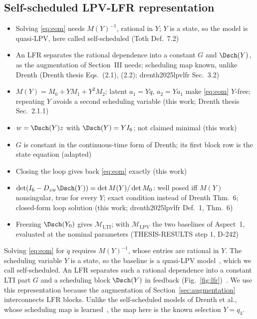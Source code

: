 \subsection{Self-scheduled LPV-LFR representation}\label{sec:lfr}
\ifdraft
\begin{itemize}
\item Solving \eqref{eq:eom} needs $M(Y)^{-1}$, rational in $Y$; $Y$ is a state, so the model is quasi-LPV, here called self-scheduled (Toth Def.~7.2)
\item An LFR separates the rational dependence into a constant $G$ and $\Dsch(Y)$, as the augmentation of Section~III needs; scheduling map known, unlike Drenth (Drenth thesis Eqs.~(2.1), (2.2); drenth2025lpvlfr Sec.~3.2)
\item $M(Y)=M_0+YM_1+Y^2M_2$; latent $a_1=Y\ddot q$, $a_2=Ya_1$ make \eqref{eq:eom} $Y$-free; repeating $Y$ avoids a second scheduling variable (this work; Drenth thesis Sec.~2.1.1)
\item $w=\Dsch(Y)z$ with $\Dsch(Y)=YI_6$; not claimed minimal (this work)
\item $G$ is constant in the continuous-time form of Drenth; its first block row is the state equation (adapted)
\item Closing the loop gives back \eqref{eq:eom} exactly (this work)
\item $\det(I_6-D_{zw}\Dsch(Y))=\det M(Y)/\det M_0$: well posed iff $M(Y)$ nonsingular, true for every $Y$; exact condition instead of Drenth Thm.~6; closed-form loop solution (this work; drenth2025lpvlfr Def.~1, Thm.~6)
\item Freezing $\Dsch(Y_0)$ gives $\mathcal M_{\mathrm{LTI}}$; with $\mathcal M_{\mathrm{LPV}}$ the two baselines of Aspect~1, evaluated at the nominal parameters (THESIS-RESULTS step 1, D-242)
\end{itemize}
\fi
Solving \eqref{eq:eom} for $\ddot q$ requires $M(Y)^{-1}$, whose entries are
rational in $Y$.
The scheduling variable $Y$ is a state, so the baseline is a quasi-LPV
model~\cite[Def.~7.2]{toth2010modeling}, which we call self-scheduled.
An LFR separates such a rational dependence into a constant LTI part $G$ and a
scheduling block $\Dsch(Y)$ in feedback
(Fig.~\ref{fig:lfr})~\cite[Eqs.~(2.1), (2.2)]{drenth2025thesis}.
We use this representation because the augmentation of
Section~\ref{sec:augmentation} interconnects LFR blocks.
Unlike the self-scheduled models of Drenth et al., whose scheduling map is
learned~\cite[Sec.~3.2]{drenth2025lpvlfr}, the map here is the known selection
$Y=q_3$.

